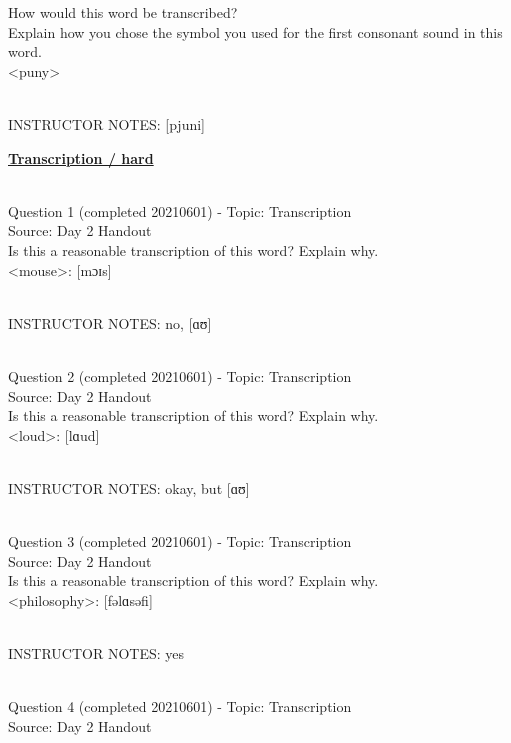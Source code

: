 \documentclass[12pt]{article}
\begin{document}
How would this word be transcribed?\\ Explain how you chose the symbol you used for the first consonant sound in this word.\\

<puny>


~\\
INSTRUCTOR NOTES: [pjuni]


\newpage\textbf{\underline{\huge Transcription / hard\\}}

~\\

{\large Question 1} (completed 20210601) - Topic: Transcription\\
Source: Day 2 Handout\\

Is this a reasonable transcription of this word? Explain why.\\

<mouse>: {[mɔɪs]}


~\\
INSTRUCTOR NOTES: no, [ɑʊ]


~\\

{\large Question 2} (completed 20210601) - Topic: Transcription\\
Source: Day 2 Handout\\

Is this a reasonable transcription of this word? Explain why.\\

<loud>: {[lɑud]}


~\\
INSTRUCTOR NOTES: okay, but [ɑʊ]


~\\

{\large Question 3} (completed 20210601) - Topic: Transcription\\
Source: Day 2 Handout\\

Is this a reasonable transcription of this word? Explain why.\\

<philosophy>: {[fəlɑsəfi]}


~\\
INSTRUCTOR NOTES: yes


~\\

{\large Question 4} (completed 20210601) - Topic: Transcription\\
Source: Day 2 Handout\\
\end{document}
